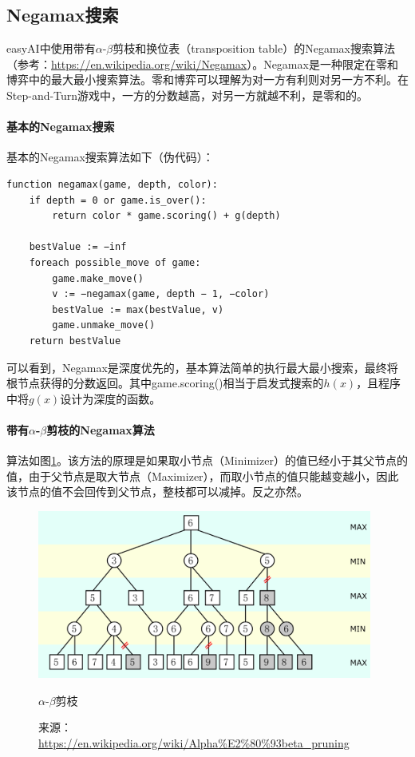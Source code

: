 \subsection{Negamax搜索}
easyAI中使用带有$\alpha$-$\beta$剪枝和换位表（transposition table）的Negamax搜索算法（参考：\url{https://en.wikipedia.org/wiki/Negamax}）。Negamax是一种限定在零和博弈中的最大最小搜索算法。零和博弈可以理解为对一方有利则对另一方不利。在Step-and-Turn游戏中，一方的分数越高，对另一方就越不利，是零和的。
\paragraph{基本的Negamax搜索}
基本的Negamax搜索算法如下（伪代码）：

\begin{lstlisting}
function negamax(game, depth, color):
	if depth = 0 or game.is_over():
		return color * game.scoring() + g(depth)

	bestValue := −inf
	foreach possible_move of game:
		game.make_move()
		v := −negamax(game, depth − 1, −color)
		bestValue := max(bestValue, v)
		game.unmake_move()
	return bestValue

\end{lstlisting}

可以看到，Negamax是深度优先的，基本算法简单的执行最大最小搜索，最终将根节点获得的分数返回。其中{\ttfamily game.scoring()}相当于启发式搜索的$h(x)$，且程序中将$g(x)$设计为深度的函数。

\paragraph{带有$\alpha$-$\beta$剪枝的Negamax算法}
算法如图\ref{fig:ab_prune}。该方法的原理是如果取小节点（Minimizer）的值已经小于其父节点的值，由于父节点是取大节点（Maximizer），而取小节点的值只能越变越小，因此该节点的值不会回传到父节点，整枝都可以减掉。反之亦然。

\begin{figure}[htbp]
\centering
\includegraphics[width=11cm]{pic/ab_prune.png}
\caption{$\alpha$-$\beta$剪枝}
\caption*{来源：\url{https://en.wikipedia.org/wiki/Alpha\%E2\%80\%93beta_pruning}}
\label{fig:ab_prune}
\end{figure}

